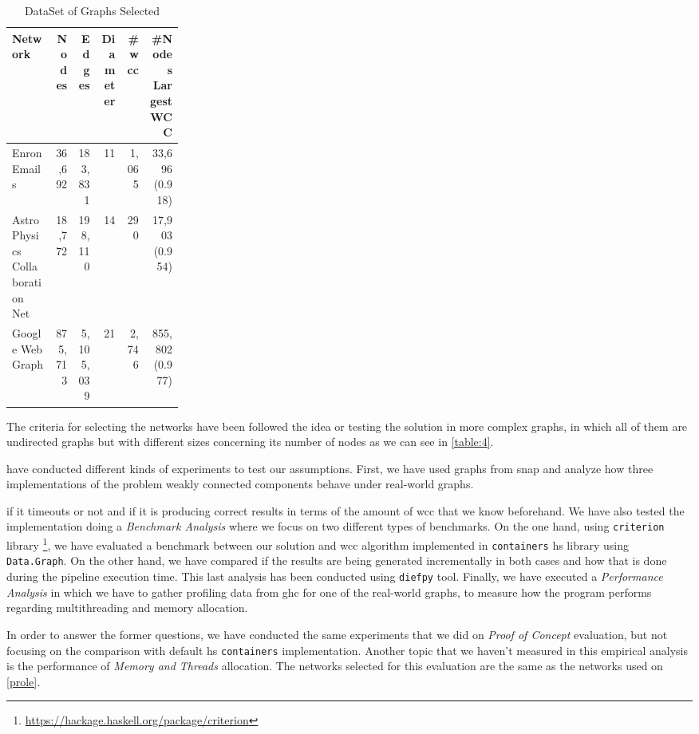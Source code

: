 \begin{table}[H]
  \centering
  \begin{tabular}{|p{0.25\linewidth}|r|r|r|r|r|}
   \hline
   \textbf{Network} & \textbf{Nodes} & \textbf{Edges} & \textbf{Diameter} & \textbf{\#\acrshort{wcc}} & \textbf{\#Nodes Largest WCC} \\
   \hline
   Enron Emails & 36,692 & 183,831 & 11 & 1,065 & 33,696 (0.918) \\
   \hline
   Astro Physics Collaboration Net & 18,772 & 198,110 & 14 & 290 & 17,903 (0.954)\\
   \hline
   Google Web Graph & 875,713 & 5,105,039 & 21 & 2,746 & 855,802 (0.977)\\
   \hline
  \end{tabular}
 \caption{DataSet of Graphs Selected}
 \label{table:4}
 \end{table}
 
 The criteria for selecting the networks have been followed the idea or testing the solution in more complex graphs, in which all of them are undirected graphs but with different sizes concerning its number of nodes as we can see in  \autoref{table:4}. 
 
 \iffalse
have conducted different kinds of experiments to test our assumptions.
First, we have used graphs from \acrfull{snap} \cite{stanford} and analyze how three implementations of the problem weakly connected components behave under real-world graphs. 

if it timeouts or not and if it is producing correct results in terms of the amount of \acrshort{wcc} that we know beforehand.
We have also tested the implementation doing a \emph{Benchmark Analysis} where we focus on two different types of benchmarks. On the one hand, using \texttt{criterion} library \footnote{\url{https://hackage.haskell.org/package/criterion}}, we have evaluated a benchmark between our solution and \acrshort{wcc} algorithm implemented in \texttt{containers} \acrshort{hs} library \cite{containers} using \texttt{Data.Graph}. On the other hand, we have compared if the results are being generated incrementally in both cases and how that is done during the pipeline execution time. This last analysis has been conducted using \texttt{diefpy} tool.
Finally, we have executed a \textit{Performance Analysis} in which we have to gather profiling data from \acrfull{ghc} for one of the real-world graphs, to measure how the program performs regarding multithreading and memory allocation.


In order to answer the former questions, we have conducted the same experiments that we did on \textit{Proof of Concept} evaluation, but not focusing on the comparison with default \acrshort{hs} \texttt{containers} implementation. 
Another topic that we haven't measured in this empirical analysis is the performance of \textit{Memory and Threads} allocation. 
The networks selected for this evaluation are the same as the networks used on \autoref{prole}.

